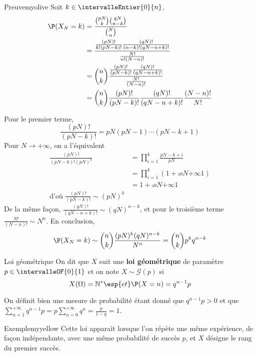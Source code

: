     \begin{demo}{Preuve}{myolive}
        Soit $k \in \intervalleEntier{0}{n}$,
        \begin{align*}
            \P(X_N = k) &= \frac{\binom{pN}{k} \binom{qN}{n-k}}{\binom{N}{n}} \\
            &= \frac{\frac{(pN)!}{k!(pN -k)!}\frac{(qN)!}{(n-k)!(qN - n + k)!}}{\frac{N!}{n!(N-n)!}} \\
            &= \binom{n}{k} \frac{\frac{(pN)!}{(pN -k)!}\frac{(qN)!}{(qN - n + k)!}}{\frac{N!}{(N-n)!}} \\
            &= \binom{n }{k} \frac{(pN)!}{(pN-k)!} \frac{(qN)!}{(qN - n + k)!} \frac{(N- n)!}{N!} 
        \end{align*}

        Pour le premier terme, 
        \[ \frac{(pN)!}{(pN - k)!} = pN (pN - 1) \cdots (pN - k + 1) \]    
        Pour $N \to +\infty$, on a l’équivalent 
        \begin{align*}
            \frac{(pN)!}{(pN - k)!(pN)^k} &= \prod_{i=1}^{k} \frac{pN - k + i}{pN} \\
            &= \prod_{i=1}^{k} (1 + \comp{o}{N}{+\infty}{1}) \\
            &= 1 + \comp{o}{N}{+\infty}{1} \\
            \text{d’où } \frac{(pN)!}{(pN-k)!} \sim (pN)^k 
        \end{align*}
        De la même façon, $\frac{(qN)!}{(qN - n + k)!} \sim (qN)^{n-k}$, et pour le troisième terme $\frac{N!}{(N-n)!} \sim N^n$. 
        En conclusion, 
        \[ \P(X_N = k) \sim \binom{n}{k} \frac{(pN)^k (qN)^{n-k}}{N^n} = \binom{n}{k} p^k q^{n-k} \]    
    \end{demo}

    \begin{defi}{Loi géométrique}{}
        On dit que $X$ suit une \textbf{loi géométrique} de paramètre $p \in \intervalleOF{0}{1}$ et on note $X \sim \mathcal{G}(p)$ si 
        \[ X(\Omega) = \mathbb{N}^* \esp{et} \P(X = n) = q^{n-1} p \]   
    \end{defi}

    On définit bien une mesure de probabilité étant donné que $q^{n-1} p > 0$ et que $\sum_{n=1}^{+\infty} q^{n-1}p = p \sum_{n=0}^{+\infty} q^n  = \frac{p}{1-q} = 1$.

    \begin{omed}{Exemple}{myyellow}
        Cette loi apparaît lorsque l’on répète une même expérience, de façon indépendante, avec une même probabilité de succès $p$, et $X$ désigne le rang du premier succès.
    \end{omed}

